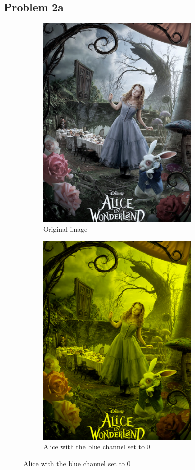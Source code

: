 \documentclass{math}
\begin{document}
\subsection*{Problem 2a}
\begin{figure}[H]
  \begin{subfigure}{0.5\linewidth}
    \centering
    \includegraphics[width=8cm]{assets/hw_01_alice_original.png}
    \caption{Original image}
  \end{subfigure}
  \begin{subfigure}{0.5\linewidth}
    \centering
    \includegraphics[width=8cm]{assets/hw_01_alice_no_blue.png}
    \caption{Alice with the blue channel set to 0}
  \end{subfigure}
\end{figure}
\end{document}
